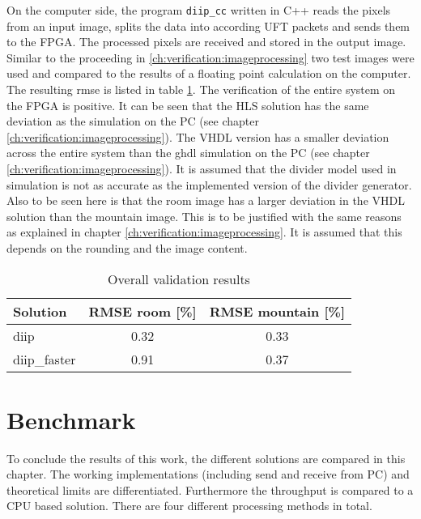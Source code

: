 On the computer side, the program \texttt{diip\_cc} written in C++ reads the
pixels from an input image, splits the data into according UFT packets and sends
them to the FPGA. The processed pixels are received and stored in the output
image. Similar to the proceeding in \ref{ch:verification:imageprocessing} two
test images were used and compared to the results of a floating point
calculation on the computer. The resulting \gls{rmse} is listed in table 
\ref{tab:overallvalidationresults}. The verification of the entire system on
the FPGA is positive. It can be seen that the HLS solution has the same
deviation as the simulation on the PC (see chapter 
\ref{ch:verification:imageprocessing}). The VHDL version has a smaller
deviation across the entire system than the \gls{ghdl} simulation on the PC (see
chapter \ref{ch:verification:imageprocessing}). It is assumed that the divider
model used in simulation is not as accurate as the implemented version of the
divider generator. Also to be seen here is that
the room image has a larger deviation in the VHDL solution than the
mountain image. This is to be justified with the same reasons as explained in
chapter \ref{ch:verification:imageprocessing}. It is assumed that this depends on the rounding and the image content. 


\begin{table}[tb!] \centering \begin{tabular}{l c c}
        \toprule
        Solution            & RMSE room [\%]    & RMSE mountain [\%]\\
        \midrule
        diip         & 0.32             & 0.33 \\
        diip\_faster & 0.91             & 0.37 \\
        \bottomrule
    \end{tabular}
    \caption{Overall validation results}
    \label{tab:overallvalidationresults}
\end{table}


%
%
\section{Benchmark}\label{ch:benchmark}
To conclude the results of this work, the different solutions are compared in
this chapter. The working implementations (including send and receive from PC)
and theoretical limits are differentiated. Furthermore the throughput is
compared to a CPU based solution.
There are four different processing methods in total.

